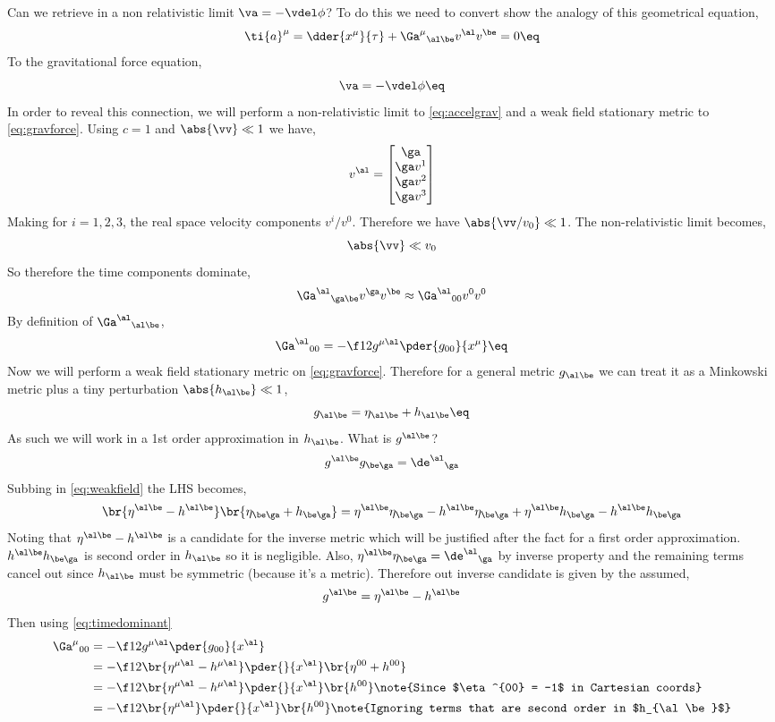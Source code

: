 \documentclass{article}
\newcommand{\mtrx}[1]{
    \begin{bmatrix}
    #1
    \end{bmatrix}
}
\begin{document}
Can we retrieve in a non relativistic limit $\va = - \vdel \phi$? To do this we need to convert show the analogy of this geometrical equation,
\[ \ti{a}^\mu = \dder{x^\mu}{\tau} + {\Ga^{\mu}}_{\al\be} v^\al v^\be = 0 \eq \label{eq:accelgrav} \]
To the gravitational force equation,
\[ \va = - \vdel \phi \eq \label{eq:gravforce}\]
In order to reveal this connection, we will perform a non-relativistic limit to \eqref{eq:accelgrav} and a weak field stationary metric to \eqref{eq:gravforce}. Using $c=1$ and $\abs{\vv} \ll 1$ we have,
\[ v^\al = \mtrx{\ga \\ \ga v^1 \\ \ga v^2 \\ \ga v^3} \]
Making for $i = 1,2,3$, the real space velocity components $v^i/v^0$. Therefore we have $\abs{\vv/v_0} \ll 1$. The non-relativistic limit becomes,
\[ \abs{\vv} \ll v_0 \]
So therefore the time components dominate,
\[ {\Ga^\al}_{\ga\be}v^\ga v^\be \approx {\Ga^\al}_{00}v^0 v^0 \]
By definition of ${\Ga^\al}_{\al\be}$,
\[ {\Ga^\al}_{00} = -\f12 g^{\mu\al} \pder{g_{00}}{x^\mu}  \eq \label{eq:timedominant}\]
Now we will perform a weak field stationary metric on \eqref{eq:gravforce}. Therefore for a general metric $g_{\al\be}$ we can treat it as a Minkowski metric plus a tiny perturbation $\abs{h_{\al\be}} \ll 1$,
\[ g_{\al\be} = \eta_{\al\be} + h_{\al\be} \eq \label{eq:weakfield} \]
As such we will work in a 1st order approximation in $h_{\al\be}$. What is $g^{\al\be}$?
\[ g^{\al\be}g_{\be\ga} = {\de^{\al}}_\ga \]
Subbing in \eqref{eq:weakfield} the LHS becomes,
\[ \br{\eta^{\al\be} - h^{\al\be}}\br{\eta_{\be\ga} + h_{\be\ga}} = \eta^{\al\be}\eta_{\be\ga} - h^{\al\be}\eta_{\be\ga} + \eta^{\al\be}h_{\be\ga} - h^{\al\be}h_{\be\ga} \]
Noting that $\eta^{\al\be} - h^{\al\be}$ is a candidate for the inverse metric which will be justified after the fact for a first order approximation. $h^{\al\be}h_{\be\ga}$ is second order in $h_{\al\be}$ so it is negligible. Also, $\eta^{\al\be}\eta_{\be\ga} = {\de^\al}_\ga$ by inverse property and the remaining terms cancel out since $h_{\al\be}$ must be symmetric (because it's a metric). Therefore out inverse candidate is given by the assumed,
\[ g^{\al\be} = \eta^{\al\be} - h^{\al\be} \]
Then using \eqref{eq:timedominant}
\begin{align*}
{\Ga^\mu}_{00} &= -\f12 g^{\mu\al} \pder{g_{00}}{x^\al}\\
&= -\f12 \br{\eta^{\mu\al} - h^{\mu\al}} \pder{}{x^\al}\br{\eta^{00} + h^{00}}\\
&= -\f12 \br{\eta^{\mu\al} - h^{\mu\al}} \pder{}{x^\al}\br{h^{00}} \note{Since $\eta^{00} = -1$ in Cartesian coords}\\
&= -\f12 \br{\eta^{\mu\al}} \pder{}{x^\al}\br{h^{00}} \note{Ignoring terms that are second order in $h_{\al\be}$}\\
\end{align*}
\end{document}
